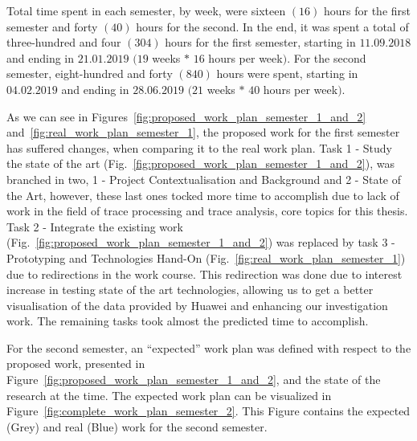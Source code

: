 Total time spent in each semester, by week, were sixteen $(16)$ hours for the first semester and forty $(40)$ hours for the second. In the end, it was spent a total of three-hundred and four $(304)$ hours for the first semester, starting in $11.09.2018$ and ending in $21.01.2019$ $(19$ weeks $*$ $16$ hours per week$)$. For the second semester, eight-hundred and forty $(840)$ hours were spent, starting in $04.02.2019$ and ending in $28.06.2019$ $(21$ weeks $*$ $40$ hours per week$)$.


As we can see in Figures~\ref{fig:proposed_work_plan_semester_1_and_2} and~\ref{fig:real_work_plan_semester_1}, the proposed work for the first semester has suffered changes, when comparing it to the real work plan. Task 1 - Study the state of the art (Fig.~\ref{fig:proposed_work_plan_semester_1_and_2}), was branched in two, 1 - Project Contextualisation and Background and 2 - State of the Art, however, these last ones tocked more time to accomplish due to lack of work in the field of trace processing and trace analysis, core topics for this thesis. Task 2 - Integrate the existing work (Fig.~\ref{fig:proposed_work_plan_semester_1_and_2}) was replaced by task 3 - Prototyping and Technologies Hand-On (Fig.~\ref{fig:real_work_plan_semester_1}) due to redirections in the work course. This redirection was done due to interest increase in testing state of the art technologies, allowing us to get a better visualisation of the data provided by Huawei and enhancing our investigation work. The remaining tasks took almost the predicted time to accomplish.

For the second semester, an ``expected'' work plan was defined with respect to the proposed work, presented in Figure~\ref{fig:proposed_work_plan_semester_1_and_2}, and the state of the research at the time. The expected work plan can be visualized in Figure~\ref{fig:complete_work_plan_semester_2}. This Figure contains the expected (Grey) and real (Blue) work for the second semester.


